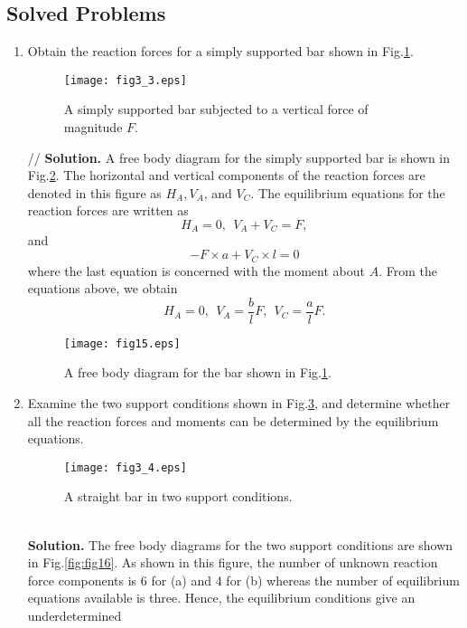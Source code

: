﻿\documentclass[10pt,a4j]{article}
\begin{document}
\subsection{Solved Problems}
\begin{enumerate}
\item
Obtain the reaction forces for a simply supported bar shown in Fig.\ref{fig:fig3_3}. 
\begin{figure}[h]
	\begin{center}
	\texttt{[image: fig3\_3.eps]} 
	\end{center}
	\caption{A simply supported bar subjected to a vertical force of magnitude $F$.}
	\label{fig:fig3_3}
\end{figure}
{\small
	//
	{\bf Solution.}
	A free body diagram for the simply supported bar is shown in Fig.\ref{fig:fig15}. 
	The horizontal and vertical components of the reaction forces are denoted in
	this figure as $H_A, V_A$, and $V_C$.
	The equilibrium equations for the reaction forces are written as 
	\[
		H_A=0, \ \ V_A+V_C=F, 
	\]
	and 
	\[
		-F\times a +V_C\times l =0
	\]
	where the last equation is concerned with the moment about $A$.
	From the equations above, we obtain
	\[
		H_A=0, \ \ V_A=\frac{b}{l}F, \ \ V_C=\frac{a}{l}F.
	\]
}
	\begin{figure}[h]
	\begin{center}
	\texttt{[image: fig15.eps]} 
	\end{center}
	\caption{A free body diagram for the bar shown in Fig.\ref{fig:fig3_3}.} 
	\label{fig:fig15}
	\end{figure}
\item
Examine the two support conditions shown in Fig.\ref{fig:fig3_4}, 
and determine whether all the reaction forces and moments can 
be determined by the equilibrium equations. 
\begin{figure}[h]
	\begin{center}
	\texttt{[image: fig3\_4.eps]} 
	\end{center}
	\caption{A straight bar in two support conditions.} 
	\label{fig:fig3_4}
\end{figure}
{\small
	\\
	{\bf Solution.}
	The free body diagrams for the two support conditions are shown in Fig.\ref{fig:fig16}. 
	As shown in this figure, the number of unknown reaction force components is  
	6 for (a) and 4 for (b) whereas the number of equilibrium equations 
	available is three. Hence, the equilibrium conditions give an underdetermined 
}
\end{enumerate}
\end{document}
